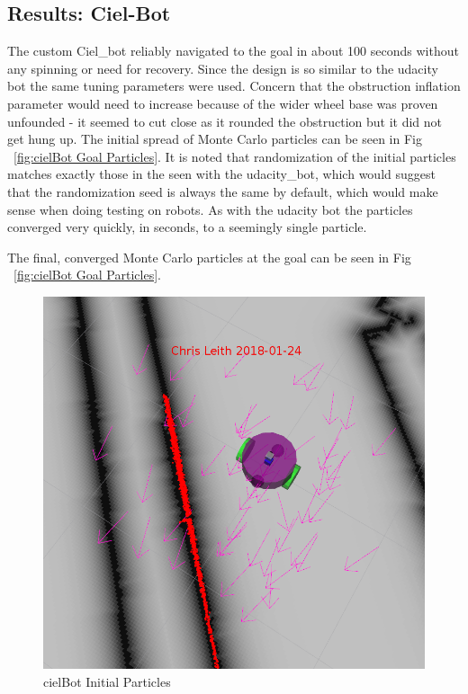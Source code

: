 \documentclass[10pt,journal,compsoc]{IEEEtran}
\begin{document}
\subsection{Results: Ciel-Bot}
The custom Ciel\_bot reliably navigated to the goal in about 100 seconds without any spinning or need for recovery. Since the design is so similar to the udacity bot the same tuning parameters were used. Concern that the obstruction inflation parameter would need to increase because of the wider wheel base was proven unfounded - it seemed to cut close as it rounded the obstruction but it did not get hung up.
The initial spread of Monte Carlo particles can be seen in Fig ~\ref{fig:cielBot Goal Particles}. 
It is noted that randomization of the initial particles matches exactly those in the seen with the udacity\_bot, which would suggest that the randomization seed is always the same by default, which would make sense when doing testing on robots. As with the udacity bot the particles converged very quickly, in seconds, to a seemingly single particle.

The final, converged Monte Carlo particles at the goal can be seen in Fig ~\ref{fig:cielBot Goal Particles}.

\begin{figure}[h]
      \centering
      \includegraphics[width=\linewidth]{../Assets/writeupImages/cielBot_rvizInit.png}
      \caption{cielBot Initial Particles }
      \label{fig:cielBot Initial Particles}
\end{figure}
\end{document}

